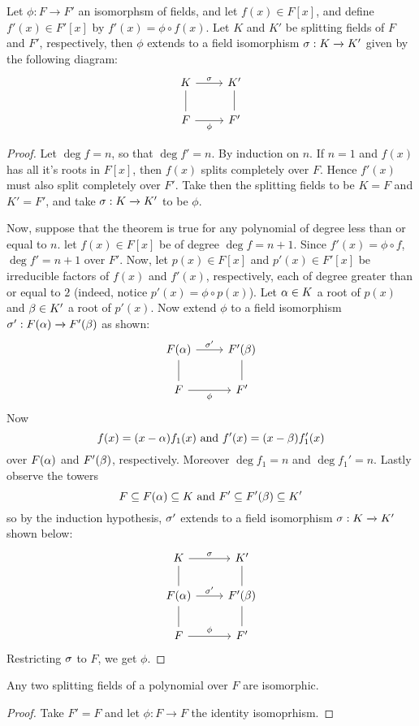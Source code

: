 \begin{theorem}\label{theorem_8.4.4}
  Let $\phi:F \xrightarrow{} F'$ an isomorphsm of fields, and let
  $f(x) \in F[x]$, and define $f'(x) \in F'[x]$ by $f'(x)=\phi \circ
  f(x)$. Let $K$ and $K'$ be splitting fields of $F$ and $F'$,
  respectively, then $\phi$ extends to a field isomorphism $\sigma:K
  \xrightarrow{} K'$ given by the following diagram:
  \[\begin{tikzcd}
    K & {K'} \\
    F & {F'}
    \arrow["\s", from=1-1, to=1-2]
    \arrow[no head, from=2-1, to=1-1]
    \arrow["\phi"', from=2-1, to=2-2]
    \arrow[no head, from=2-2, to=1-2]
  \end{tikzcd}\]
\end{theorem}
\begin{proof}
  Let $\deg{f}=n$, so that $\deg{f'}=n$. By induction on $n$. If $n=1$
  and $f(x)$ has all it's roots in $F[x]$, then $f(x)$ splits
  completely over $F$. Hence $f'(x)$ must also split completely over
  $F'$. Take then the splitting fields to be $K=F$ and $K'=F'$, and
  take $\sigma:K \xrightarrow{} K'$ to be $\phi$.

  Now, suppose that the theorem is true for any polynomial of degree
  less than or equal to $n$. let $f(x) \in F[x]$ be of degree
  $\deg{f}=n+1$. Since $f'(x)=\phi \circ f$, $\deg{f'}=n+1$ over $F'$.
  Now, let $p(x) \in F[x]$ and $p'(x) \in F'[x]$ be irreducible
  factors of $f(x)$ and $f'(x)$, respectively, each of degree greater
  than or equal to $2$ (indeed, notice $p'(x)=\phi \circ p(x)$). Let
  $\alpha \in K$ a root of $p(x)$ and $\beta \in K'$ a root of $p'(x)$. Now
  extend $\phi$ to a field isomorphism  $\sigma':F(\alpha) \xrightarrow{}
  F'(\beta)$ as shown:
  \[\begin{tikzcd}
    {F(\a)} & {F'(\b)} \\
    F & {F'}
    \arrow["{\s'}", from=1-1, to=1-2]
    \arrow[no head, from=2-1, to=1-1]
    \arrow["\phi"', from=2-1, to=2-2]
    \arrow[no head, from=2-2, to=1-2]
  \end{tikzcd}\]
  Now
  \begin{equation*}
    f(x)=(x-\alpha)f_1(x) \text{ and } f'(x)=(x-\beta)f_1'(x)
  \end{equation*}
  over $F(\alpha)$ and $F'(\beta)$, respectively. Moreover $\deg{f_1}=n$ and
  $\deg{f_1'}=n$. Lastly observe the towers
  \begin{equation*}
    F \subseteq F(\alpha) \subseteq K \text{ and }
    F' \subseteq F'(\beta) \subseteq K'
  \end{equation*}
  so by the induction hypothesis, $\sigma'$ extends to a field isomorphism
  $\sigma:K \xrightarrow{} K'$ shown below:
  \[\begin{tikzcd}
    K & {K'} \\
    {F(\a)} & {F'(\b)} \\
    F & {F'}
    \arrow["\s", from=1-1, to=1-2]
    \arrow[no head, from=2-1, to=1-1]
    \arrow["{\s'}", from=2-1, to=2-2]
    \arrow[no head, from=2-2, to=1-2]
    \arrow[no head, from=3-1, to=2-1]
    \arrow["\phi", from=3-1, to=3-2]
    \arrow[no head, from=3-2, to=2-2]
  \end{tikzcd}\]
  Restricting $\sigma$ to $F$, we get $\phi$.
\end{proof}
\begin{corollary}
  Any two splitting fields of a polynomial over $F$ are isomorphic.
\end{corollary}
\begin{proof}
  Take $F'=F$ and let $\phi:F \xrightarrow{} F$ the identity
  isomoprhism.
\end{proof}
